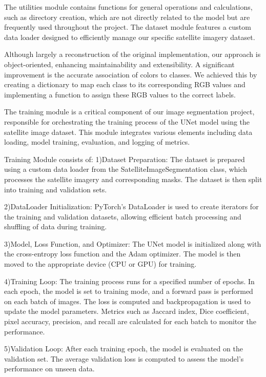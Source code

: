 \documentclass{article}
\begin{document}
The utilities module contains functions for general operations and calculations, such as directory creation, which are not directly related to the model but are frequently used throughout the project. The dataset module features a custom data loader designed to efficiently manage our specific satellite imagery dataset.

Although largely a reconstruction of the original implementation, our approach is object-oriented, enhancing maintainability and extensibility. A significant improvement is the accurate association of colors to classes. We achieved this by creating a dictionary to map each class to its corresponding RGB values and implementing a function to assign these RGB values to the correct labels.

The training module is a critical component of our image segmentation project, responsible for orchestrating the training process of the UNet model using the satellite image dataset. This module integrates various elements including data loading, model training, evaluation, and logging of metrics.

 Training Module consists of:
1)Dataset Preparation:
The dataset is prepared using a custom data loader from the SatelliteImageSegmentation class, which processes the satellite imagery and corresponding masks. The dataset is then split into training and validation sets.

2)DataLoader Initialization:
PyTorch's DataLoader is used to create iterators for the training and validation datasets, allowing efficient batch processing and shuffling of data during training.

3)Model, Loss Function, and Optimizer:
The UNet model is initialized along with the cross-entropy loss function and the Adam optimizer. The model is then moved to the appropriate device (CPU or GPU) for training.

4)Training Loop:
The training process runs for a specified number of epochs. In each epoch, the model is set to training mode, and a forward pass is performed on each batch of images. The loss is computed and backpropagation is used to update the model parameters. Metrics such as Jaccard index, Dice coefficient, pixel accuracy, precision, and recall are calculated for each batch to monitor the performance.

5)Validation Loop:
After each training epoch, the model is evaluated on the validation set. The average validation loss is computed to assess the model's performance on unseen data.
\end{document}
